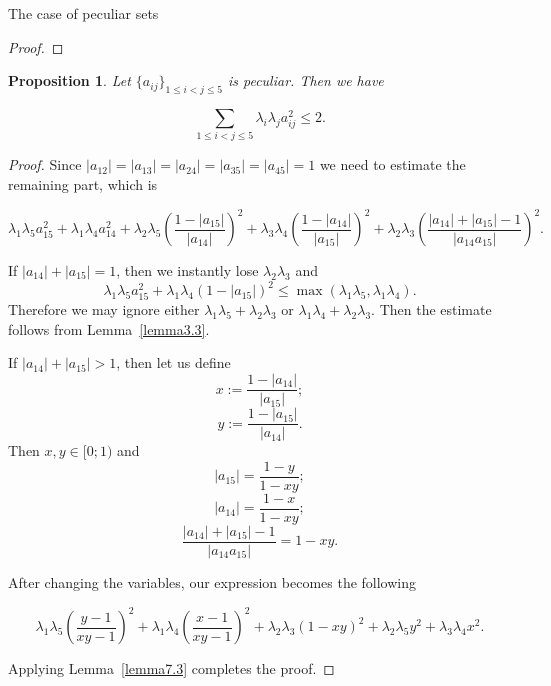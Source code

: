 \documentclass[12pt]{article}
\newtheorem{proposition}{Proposition}[section]
\begin{document}
\begin{section}{ The case of peculiar sets}
\begin{proof}
    \end{proof}
    
    \begin{proposition}
    \label{bad-case}
        Let  $\{a_{ij}\}_{1\leq i<j\leq 5}$ is peculiar. Then we have
    
        $$
             \sum_{1\leq i<j\leq 5}\lambda_{i}\lambda_{j}a_{ij}^2 \leq 2.
        $$
    \end{proposition}
    
    \begin{proof}
        Since $|a_{12}|=|a_{13}|=|a_{24}|=|a_{35}|=|a_{45}|=1$ we need to estimate the remaining part, which is 

         $$
            \lambda_{1}\lambda_{5}a_{15}^2 + \lambda_{1}\lambda_{4} a_{14}^2 + \lambda_{2}\lambda_{5}\left(\frac{1-|a_{15}|}{|a_{14}|}\right)^2 + \lambda_{3}\lambda_{4}\left(\frac{1-|a_{14}|}{|a_{15}|}\right)^2 + \lambda_{2}\lambda_{3}\left(\frac{|a_{14}|+|a_{15}| - 1}{|a_{14}a_{15}|}\right)^2 .
        $$
        
    If $|a_{14}| + |a_{15}| = 1$, then we instantly lose $\lambda_{2}\lambda_{3}$ and 
       $$
            \lambda_{1}\lambda_{5}a_{15}^2 + \lambda_{1}\lambda_{4}(1-|a_{15}|)^2 \leq \max (\lambda_{1}\lambda_{5},\lambda_{1}\lambda_{4}).
       $$
    Therefore we may ignore  either $\lambda_{1}\lambda_{5} + \lambda_{2}\lambda_{3}$ or $\lambda_{1}\lambda_{4} + \lambda_{2}\lambda_{3}$. Then the estimate follows from Lemma~\ref{lemma3.3}.
    
        
        If $|a_{14}| + |a_{15}| > 1$, then let us define 
        $$
            x:=\frac{1-|a_{14}|}{|a_{15}|};
        $$
        $$         y:=\frac{1-|a_{15}|}{|a_{14}|}.
        $$
        Then $x,y\in [0;1)$ and 
        $$
            |a_{15}| = \frac{1-y}{1-xy};
        $$
         $$
            |a_{14}| = \frac{1-x}{1-xy};
        $$
        $$
            \frac{|a_{14}|+|a_{15}| - 1}{|a_{14}a_{15}|} = 1-xy.
        $$

        After changing the variables, our expression becomes the following

        $$      \lambda_{1}\lambda_{5}\left(\frac{y-1}{xy-1}\right)^2 + \lambda_{1}\lambda_{4} \left(\frac{x-1}{xy-1}\right)^2 + \lambda_{2}\lambda_{3}(1-xy)^2 + \lambda_{2}\lambda_{5}y^{2} + \lambda_{3}\lambda_{4}x^{2} .
        $$ 

        Applying Lemma~\ref{lemma7.3} completes the proof.
        
           
    \end{proof}

\end{section}
\end{document}
